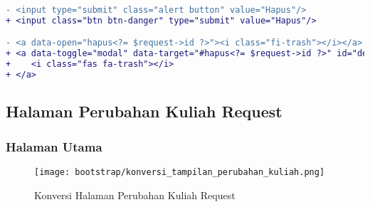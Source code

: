 \begin{lstlisting}[language=diff, caption=Kode untuk Modal Cetak Transkrip Manage, label=Entri, basicstyle=\ttfamily, frame=single,
columns=fullflexible, keepspaces=true, breaklines=true]
- <input type="submit" class="alert button" value="Hapus"/>
+ <input class="btn btn-danger" type="submit" value="Hapus"/>

- <a data-open="hapus<?= $request->id ?>"><i class="fi-trash"></i></a>
+ <a data-toggle="modal" data-target="#hapus<?= $request->id ?>" id="detailIkon<?= $request->id ?>">
+    <i class="fas fa-trash"></i>
+ </a>
\end{lstlisting}

\subsection{Halaman Perubahan Kuliah Request}
\subsubsection{Halaman Utama}
\begin{figure} [H]
	\centering  
	\texttt{[image: bootstrap/konversi\_tampilan\_perubahan\_kuliah.png]}
	\caption{Konversi Halaman Perubahan Kuliah Request}
\end{figure}
